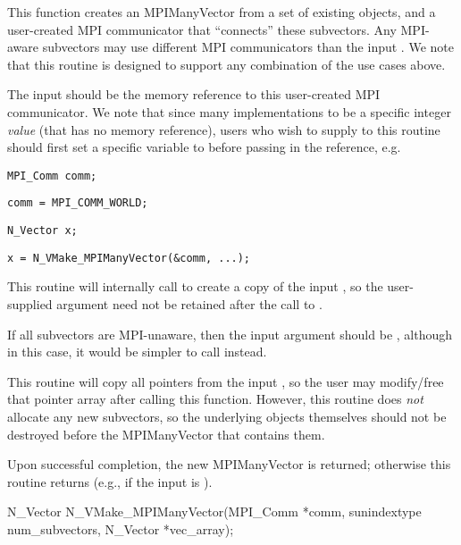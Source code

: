 {
  This function creates an MPIManyVector from a set of existing {\nvector}
  objects, and a user-created MPI communicator that ``connects'' these
  subvectors.  Any MPI-aware subvectors may use different MPI
  communicators than the input .  We note that this routine
  is designed to support any combination of the use cases above.

  The input  should be the memory reference to this
  user-created MPI communicator.  We note that since many {\mpi}
  implementations   to be a specific
  integer \emph{value} (that has no memory reference), users who wish
  to supply  to this routine should first
  set a specific  variable to 
  before passing in the reference, e.g.

  \hspace{0.5in} \texttt{MPI\_Comm comm;}\vspace{-0.5em}
  
  \hspace{0.5in} \texttt{comm = MPI\_COMM\_WORLD;}\vspace{-0.5em}
  
  \hspace{0.5in} \texttt{N\_Vector x;}\vspace{-0.5em}
  
  \hspace{0.5in} \texttt{x = N\_VMake\_MPIManyVector(\&comm, ...);}

  This routine will internally call  to create a
  copy of the input , so the user-supplied  argument
  need not be retained after the call to .

  If all subvectors are MPI-unaware, then the input  argument
  should be , although in this case, it would be simpler to
  call  instead.
  
  This routine will copy all  pointers from the input
  , so the user may modify/free that pointer array
  after calling this function.  However, this routine does \emph{not}
  allocate any new subvectors, so the underlying {\nvector} objects
  themselves should not be destroyed before the MPIManyVector that
  contains them.

  Upon successful completion, the new MPIManyVector is returned;
  otherwise this routine returns  (e.g., if the input
   is ).
}
{
  N\_Vector N\_VMake\_MPIManyVector(MPI\_Comm *comm, 
  sunindextype num\_subvectors,
  N\_Vector *vec\_array);
}
